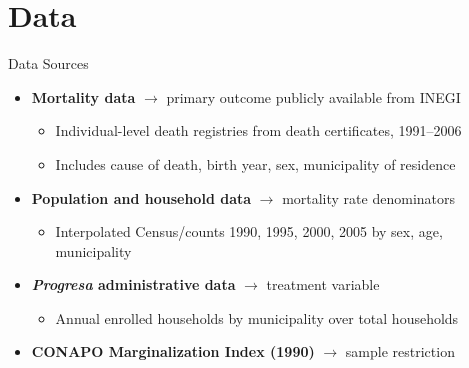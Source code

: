 \documentclass[aspectratio=169,usenames,dvipsnames]{beamer}
\begin{document}

\section{Data}

\begin{frame}{Data Sources}\label{data}
\footnotesize
\begin{itemize}
  \item \textbf{Mortality data} $\rightarrow$ primary outcome publicly available from INEGI
    \begin{itemize}
      \item Individual-level death registries from death certificates, 1991--2006 
      \item Includes cause of death, birth year, sex, municipality of residence
    \end{itemize}
  \vspace{1pt}
  \item \textbf{Population and household data} $\rightarrow$ mortality rate denominators
    \begin{itemize}
      \item Interpolated Census/counts 1990, 1995, 2000, 2005 by sex, age, municipality
    \end{itemize}
  \vspace{1pt}
  \item \textbf{\textit{Progresa} administrative data} $\rightarrow$ treatment variable
    \begin{itemize}
      \item Annual enrolled households by municipality over total households 
    \end{itemize}
  \vspace{1pt}
  \item \textbf{CONAPO Marginalization Index (1990)} $\rightarrow$ sample restriction
    \begin{itemize}

\end{itemize}
\end{itemize}
\end{frame}
\end{document}
